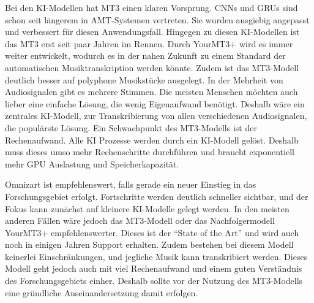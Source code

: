 Bei den KI-Modellen hat MT3 einen klaren Vorsprung.
CNNs und GRUs sind schon seit längerem in AMT-Systemen vertreten.
Sie wurden ausgiebig angepasst und verbessert für diesen Anwendungsfall.
Hingegen zu diesen KI-Modellen ist das MT3 erst seit paar Jahren im Rennen.
Durch YourMT3+ wird es immer weiter entwickelt,
wodurch es in der nahen Zukunft zu einem Standard der automatischen Musiktranskription werden könnte.
Zudem ist das MT3-Modell deutlich besser auf polyphone Musikstücke ausgelegt.
In der Mehrheit von Audiosignalen gibt es mehrere Stimmen.
Die meisten Menschen möchten auch lieber eine einfache Lösung, die wenig Eigenaufwand benötigt.
Deshalb wäre ein zentrales KI-Modell, zur Transkribierung von allen verschiedenen Audiosignalen, die populärste Lösung.
Ein Schwachpunkt des MT3-Modells ist der Rechenaufwand.
Alle KI Prozesse werden durch ein KI-Modell gelöst.
Deshalb muss dieses umso mehr Rechenschritte durchführen und braucht exponentiell mehr GPU Auslastung und Speicherkapazität.

Omnizart ist empfehlenswert, falls gerade ein neuer Einstieg in das Forschungsgebiet erfolgt.
Fortschritte werden deutlich schneller sichtbar, und der Fokus kann zunächst auf kleinere KI-Modelle gelegt werden.
In den meisten anderen Fällen wäre jedoch das MT3-Modell oder das Nachfolgermodell YourMT3+ empfehlenswerter.
Dieses ist der \enquote{State of the Art} und wird auch noch in einigen Jahren Support erhalten.
Zudem bestehen bei diesem Modell keinerlei Einschränkungen, und jegliche Musik kann transkribiert werden.
Dieses Modell geht jedoch auch mit viel Rechenaufwand und einem guten Verständnis des Forschungsgebiets einher.
Deshalb sollte vor der Nutzung des MT3-Modells eine gründliche Auseinandersetzung damit erfolgen.